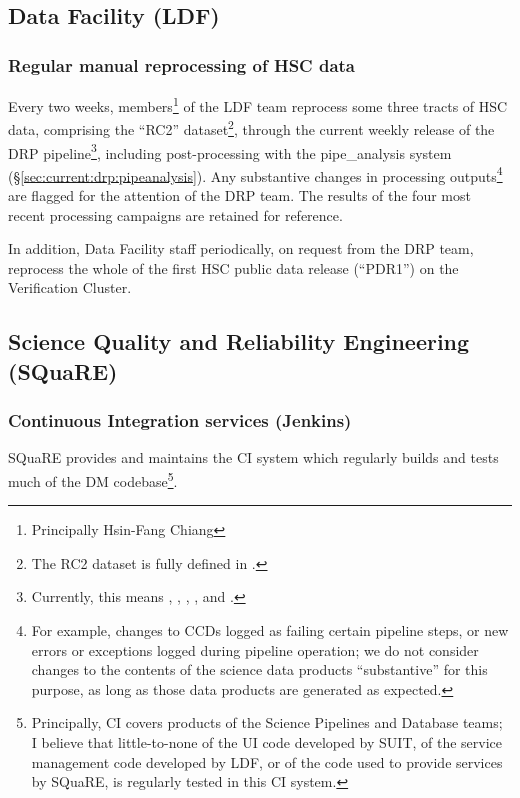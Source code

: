 \documentclass[DM,authoryear,toc,lsstdraft]{lsstdoc}
\begin{document}
\subsection{Data Facility (LDF)}
\label{sec:current:ldf}

\subsubsection{Regular manual reprocessing of HSC data}
\label{sec:current:ldf:hsc}

Every two weeks, members\footnote{Principally Hsin-Fang Chiang} of the LDF
team reprocess some three tracts of HSC data, comprising the ``RC2''
dataset\footnote{The RC2 dataset is fully defined in .},
through the current weekly release of the DRP pipeline\footnote{Currently,
this means , ,
, ,  and
.}, including post-processing with the pipe\_analysis
system (\S\ref{sec:current:drp:pipeanalysis}). Any substantive changes in
processing outputs\footnote{For example, changes to CCDs logged as failing
certain pipeline steps, or new errors or exceptions logged during pipeline
operation; we do not consider changes to the contents of the science data
products ``substantive'' for this purpose, as long as those data products are
generated as expected.} are flagged for the attention of the DRP team. The
results of the four most recent processing campaigns are retained for
reference.

In addition, Data Facility staff periodically, on request from the DRP team,
reprocess the whole of the first HSC public data release (``PDR1'') on the
Verification Cluster.

\subsection{Science Quality and Reliability Engineering (SQuaRE)}
\label{sec:current:square}

\subsubsection{Continuous Integration services (Jenkins)}
\label{sec:current:square:ci}

SQuaRE provides and maintains the CI system which regularly builds and
tests much of the DM codebase\footnote{Principally, CI covers products of
the Science Pipelines and Database teams; I believe that little-to-none of the
UI code developed by SUIT, of the service management code developed by LDF, or
of the code used to provide services by SQuaRE, is regularly tested in this CI
system.}.
\end{document}
